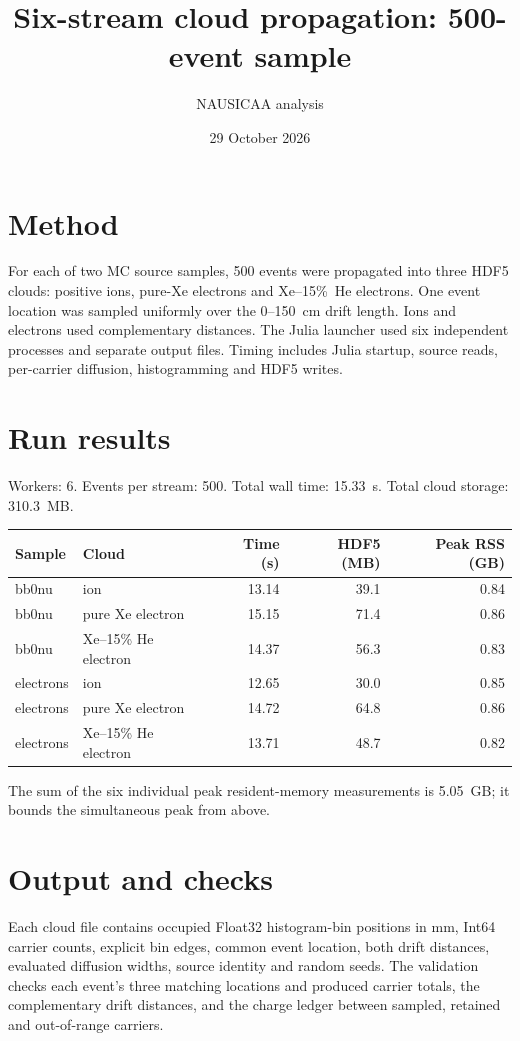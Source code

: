 \documentclass{article}
\title{Six-stream cloud propagation: 500-event sample}
\author{NAUSICAA analysis}
\date{29 October 2026}
\begin{document}
\maketitle
\section*{Method}
For each of two MC source samples, 500 events were propagated into three
HDF5 clouds: positive ions, pure-Xe electrons and Xe--15\%~He electrons.
One event location was sampled uniformly over the 0--150~cm drift length.
Ions and electrons used complementary distances. The Julia launcher used
six independent processes and separate output files. Timing includes Julia
startup, source reads, per-carrier diffusion, histogramming and HDF5 writes.

\section*{Run results}
Workers: 6. Events per stream: 500. Total wall time: 15.33~s. Total cloud storage: 310.3~MB.

\begin{center}
\begin{tabular}{llrrr}
\toprule
Sample & Cloud & Time (s) & HDF5 (MB) & Peak RSS (GB) \\
\midrule
bb0nu & ion & 13.14 & 39.1 & 0.84 \\
bb0nu & pure Xe electron & 15.15 & 71.4 & 0.86 \\
bb0nu & Xe--15\% He electron & 14.37 & 56.3 & 0.83 \\
electrons & ion & 12.65 & 30.0 & 0.85 \\
electrons & pure Xe electron & 14.72 & 64.8 & 0.86 \\
electrons & Xe--15\% He electron & 13.71 & 48.7 & 0.82 \\
\bottomrule
\end{tabular}
\end{center}
The sum of the six individual peak resident-memory measurements is 5.05~GB; it bounds the simultaneous peak from above.

\section*{Output and checks}
Each cloud file contains occupied Float32 histogram-bin positions in mm,
Int64 carrier counts, explicit bin edges, common event location, both drift
distances, evaluated diffusion widths, source identity and random seeds.
The validation checks each event's three matching locations and produced
carrier totals, the complementary drift distances, and the charge ledger
between sampled, retained and out-of-range carriers.
\end{document}
